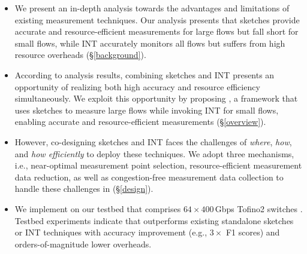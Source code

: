 \begin{itemize}[leftmargin=*]
%
    \item We present an in-depth analysis towards the advantages and limitations of existing measurement techniques. Our analysis presents that sketches provide accurate and resource-efficient measurements for large flows but fall short for small flows, while INT accurately monitors all flows but suffers from high resource overheads (\S\ref{background}). 
%
    \item According to analysis results, combining sketches and INT presents an opportunity of realizing both high accuracy and resource efficiency simultaneously. We exploit this opportunity by proposing \sysname, a framework that uses sketches to measure large flows while invoking INT for small flows, enabling accurate and resource-efficient measurements (\S\ref{overview}). 
%
    \item However, co-designing sketches and INT faces the challenges of \emph{where}, \emph{how}, and \emph{how efficiently} to deploy these techniques. We adopt three mechanisms, i.e., near-optimal measurement point selection, resource-efficient measurement data reduction, as well as congestion-free measurement data collection to handle these challenges in \sysname (\S\ref{design}). 
%
    \item We implement \sysname on our testbed that comprises $64\times 400$\,Gbps Tofino2 switches \cite{tofino2}. Testbed experiments indicate that \sysname outperforms existing standalone sketches or INT techniques with accuracy improvement (e.g., $3\times$ F1 scores) and orders-of-magnitude lower overheads. 
%
\end{itemize}

